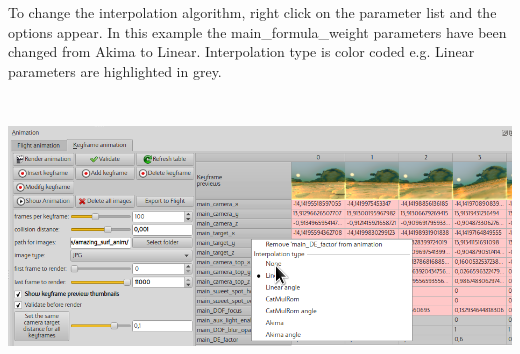 To change the interpolation algorithm, right click on the parameter list and the
options appear. In this example the main\_formula\_weight parameters have been
changed from Akima to Linear. Interpolation type is color coded e.g. Linear
parameters are highlighted in grey.

\includegraphics[width=6.69291in,height=2.92087in]{img/manual/media/image26.png}
